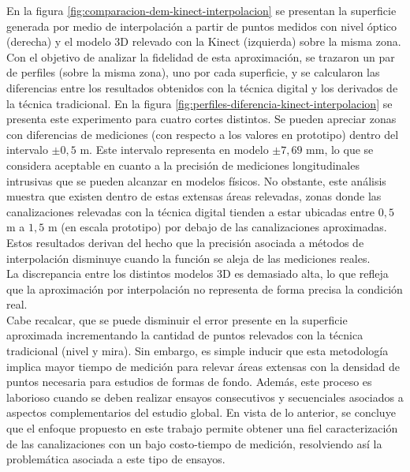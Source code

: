 En la figura \ref{fig:comparacion-dem-kinect-interpolacion} se presentan la superficie generada por medio de interpolación a partir de puntos medidos con nivel óptico (derecha) y el modelo 3D relevado con la Kinect (izquierda) sobre la misma zona. \\
Con el objetivo de analizar la fidelidad de esta aproximación, se trazaron un par de perfiles (sobre la misma zona), uno por cada superficie, y se calcularon las diferencias entre los resultados obtenidos con la técnica digital y los derivados de la técnica tradicional. En la figura \ref{fig:perfiles-diferencia-kinect-interpolacion} se presenta este experimento para cuatro cortes distintos. Se pueden apreciar zonas con diferencias de mediciones (con respecto a los valores en prototipo) dentro del intervalo $\pm0,5$ m. Este intervalo representa en modelo $\pm 7,69$ mm, lo que se considera aceptable en cuanto a la precisión de mediciones longitudinales intrusivas que se pueden alcanzar en modelos físicos. No obstante, este análisis muestra que existen dentro de estas extensas áreas relevadas, zonas donde las canalizaciones relevadas con la técnica digital tienden a estar ubicadas entre $0,5$ m a $1,5$ m (en escala prototipo) por debajo de las canalizaciones aproximadas. Estos resultados derivan del hecho que la precisión asociada a métodos de interpolación disminuye cuando la función se aleja de las mediciones reales. \\
La discrepancia entre los distintos modelos 3D es demasiado alta, lo que refleja que la aproximación por interpolación no representa de forma precisa la condición real. \\
Cabe recalcar, que se puede disminuir el error presente en la superficie aproximada incrementando la cantidad de puntos relevados con la técnica tradicional (nivel y mira). Sin embargo, es simple inducir que esta metodología implica mayor tiempo de medición para relevar áreas extensas con la densidad de puntos necesaria para estudios de formas de fondo. Además, este proceso es laborioso cuando se deben realizar ensayos consecutivos y secuenciales asociados a aspectos complementarios del estudio global. En vista de lo anterior, se concluye que el enfoque propuesto en este trabajo permite obtener una fiel caracterización de las canalizaciones con un bajo costo-tiempo de medición, resolviendo así la problemática asociada a este tipo de ensayos. \\

